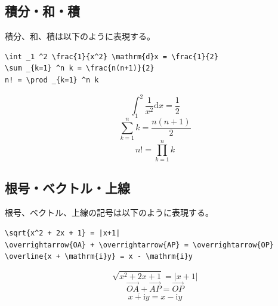 \subsection{積分・和・積}
\label{sec:latex:integration}

積分、和、積は以下のように表現する。
\begin{reidai}
\begin{verbatim}
\int _1 ^2 \frac{1}{x^2} \mathrm{d}x = \frac{1}{2}
\sum _{k=1} ^n k = \frac{n(n+1)}{2}
n! = \prod _{k=1} ^n k
\end{verbatim}
\end{reidai}
\vspace*{-1.5em}
\begin{kekka}
  \begin{equation*}
    \int _1 ^2 \frac{1}{x^2} \mathrm{d}x = \frac{1}{2}
  \end{equation*}
  \begin{equation*}
    \sum _{k=1} ^n k = \frac{n(n+1)}{2}
  \end{equation*}
  \begin{equation*}
    n! = \prod _{k=1} ^n k
  \end{equation*}
\end{kekka}

\subsection{根号・ベクトル・上線}
\label{sec:latex:root}

根号、ベクトル、上線の記号は以下のように表現する。
\begin{reidai}
\begin{verbatim}
\sqrt{x^2 + 2x + 1} = |x+1|
\overrightarrow{OA} + \overrightarrow{AP} = \overrightarrow{OP}
\overline{x + \mathrm{i}y} = x - \mathrm{i}y
\end{verbatim}
\end{reidai}
\vspace*{-1.5em}
\begin{kekka}
  \begin{equation*}
    \sqrt{x^2 + 2x + 1} = |x+1|
  \end{equation*}
  \begin{equation*}
    \overrightarrow{OA} + \overrightarrow{AP} = \overrightarrow{OP}
  \end{equation*}
  \begin{equation*}
    \overline{x + \mathrm{i}y} = x - \mathrm{i}y
  \end{equation*}
  \vspace{0pt}
\end{kekka}

